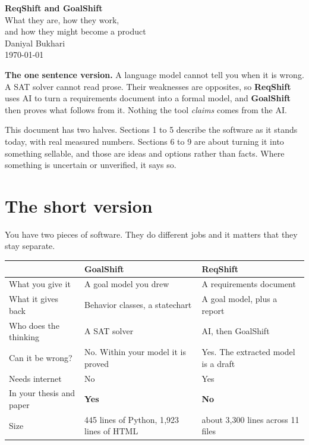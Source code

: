 \documentclass[11pt,a4paper]{article}
\newcommand{\gs}{\textbf{GoalShift}}
\newcommand{\rs}{\textbf{ReqShift}}
\begin{document}
\thispagestyle{empty}
\begin{center}
\vspace*{2.2cm}
{\Huge\bfseries\color{accent} ReqShift and GoalShift}\\[10pt]
{\LARGE What they are, how they work,\\[3pt] and how they might become a product}\\[26pt]
{\large Daniyal Bukhari}\\[6pt]
{\color{muted}\today}
\end{center}

\vspace{1.4cm}

\begin{keybox}
\textbf{The one sentence version.} A language model cannot tell you when it is wrong.
A SAT solver cannot read prose. Their weaknesses are opposites, so \rs{} uses AI to turn
a requirements document into a formal model, and \gs{} then proves what follows from it.
Nothing the tool \emph{claims} comes from the AI.
\end{keybox}

\vspace{0.6cm}
{\color{muted}\small
This document has two halves. Sections 1 to 5 describe the software as it stands today,
with real measured numbers. Sections 6 to 9 are about turning it into something
sellable, and those are ideas and options rather than facts. Where something is
uncertain or unverified, it says so.}

\newpage
\tableofcontents
\newpage

\section{The short version}

You have two pieces of software. They do different jobs and it matters that they stay
separate.

\begin{center}
\begin{tabular}{@{}p{4.2cm}p{5.1cm}p{5.1cm}@{}}
\toprule
 & \textbf{GoalShift} & \textbf{ReqShift} \\
\midrule
What you give it & A goal model you drew & A requirements document \\
What it gives back & Behavior classes, a statechart & A goal model, plus a report \\
Who does the thinking & A SAT solver & AI, then GoalShift \\
Can it be wrong? & No. Within your model it is proved & Yes. The extracted model is a draft \\
Needs internet & No & Yes \\
In your thesis and paper & \textbf{Yes} & \textbf{No} \\
Size & 445 lines of Python, 1{,}923 lines of HTML & about 3{,}300 lines across 11 files \\
\bottomrule
\end{tabular}
\end{center}
\end{document}

